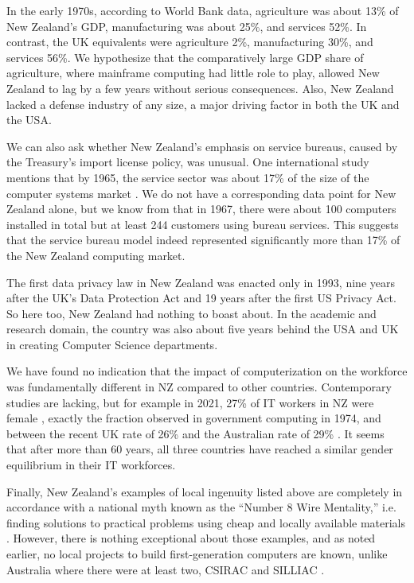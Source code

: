 \documentclass{IEEEcsmag}
\begin{document}
In the early 1970s, according to World Bank data, agriculture was about 13\% of New Zealand’s GDP, manufacturing
was about 25\%, and services 52\%. In contrast, the UK equivalents were agriculture 2\%, manufacturing 30\%,
and services 56\%. We hypothesize that the comparatively large GDP share of agriculture, where mainframe computing had
little role to play, allowed New Zealand to lag by a few years without serious consequences. Also, New Zealand lacked a defense industry of any size, a major driving factor in both the UK and the USA.

We can also ask whether New Zealand’s emphasis on service bureaus, caused by the Treasury’s import
license policy, was unusual.  One international study mentions that by 1965, the service sector was about 17\% of the
size of the computer systems market \cite{Campbell-Kelly-2008}. We do not have a corresponding data point for
New Zealand alone, but we know from \cite{ScottSurvey1967} that in 1967, there were about 100 computers
installed in total but at least 244 customers using bureau services. This suggests that the service bureau
model indeed represented significantly more than 17\% of the New Zealand computing market.

The first data privacy law in New Zealand was enacted only in 1993, nine years
after the UK’s Data Protection Act and 19 years after the first US Privacy Act. So here too,
New Zealand had nothing to boast about. In the academic and research domain, the country was
also about five years behind the USA and UK in creating Computer Science departments.

We have found no indication that the impact of computerization on the workforce was fundamentally
different in NZ compared to other countries. Contemporary studies are lacking, but for example
in 2021, 27\% of IT workers in NZ were female \cite{NZTIA-2022}, exactly the fraction observed
in government computing in 1974, and between the recent UK rate of 26\% \cite{WISE-2023}
and the Australian rate of 29\% \cite{Deloitte-2022}. It seems that after more than 60 years,
all three countries have reached a similar gender equilibrium in their IT workforces.

Finally, New Zealand’s examples of local ingenuity listed above are completely in accordance
with a national myth known as the “Number 8 Wire Mentality,” i.e. finding solutions to practical
problems using cheap and  locally available materials \cite{NZPOD, ingenuity}. However, there is nothing
exceptional about those examples, and as noted earlier, no local projects to build first-generation
computers are known, unlike Australia where there were at least two, CSIRAC and SILLIAC \cite{Philipson-2017}.
\end{document}
